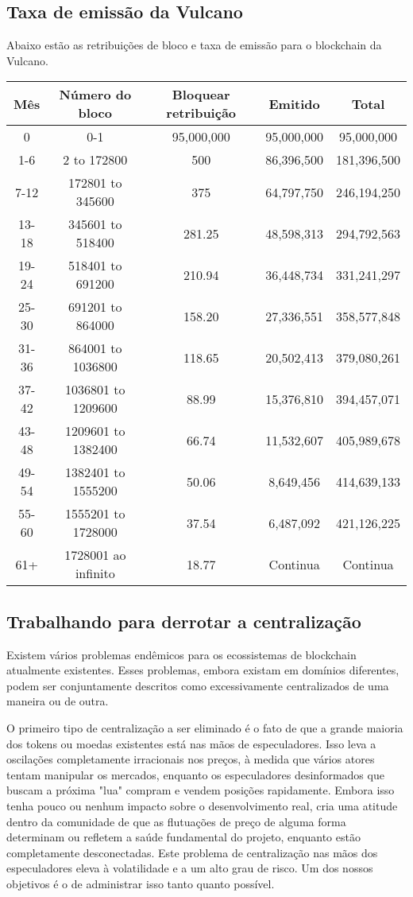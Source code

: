 \documentclass[A4paper, 12pt]{article}
\begin{document}
\subsection{Taxa de emissão da Vulcano}
Abaixo estão as retribuições de bloco e taxa de emissão para o blockchain da Vulcano.
\begin{table}[h]
\centering
\begin{tabular}{@{}ccccc@{}}
\toprule
Mês & Número do bloco & Bloquear retribuição & Emitido & Total \\ \midrule
0 & 0-1 & 95,000,000 & 95,000,000 & 95,000,000 \\
1-6 & 2 to 172800 & 500 & 86,396,500 & 181,396,500 \\
7-12 & 172801 to 345600 & 375 & 64,797,750 & 246,194,250 \\
13-18 & 345601 to 518400 & 281.25 & 48,598,313 & 294,792,563 \\
19-24 & 518401 to 691200 & 210.94 & 36,448,734 & 331,241,297 \\
25-30 & 691201 to 864000 & 158.20 & 27,336,551 & 358,577,848 \\
31-36 & 864001 to 1036800 & 118.65 & 20,502,413 & 379,080,261 \\
37-42 & 1036801 to 1209600 & 88.99 & 15,376,810 & 394,457,071 \\
43-48 & 1209601 to 1382400 & 66.74 & 11,532,607 & 405,989,678 \\
49-54 & 1382401 to 1555200 & 50.06 & 8,649,456 & 414,639,133 \\
55-60 & 1555201 to 1728000 & 37.54 & 6,487,092 & 421,126,225 \\
61+ & 1728001 ao infinito & 18.77 & Continua & Continua \\ \bottomrule
\end{tabular}
\end{table}

\subsection{Trabalhando para derrotar a centralização}
Existem vários problemas endêmicos para os ecossistemas de blockchain atualmente existentes. Esses problemas, embora existam em domínios diferentes, podem ser conjuntamente descritos como excessivamente centralizados de uma maneira ou de outra.

O primeiro tipo de centralização a ser eliminado é o fato de que a grande maioria dos tokens ou moedas existentes está nas mãos de especuladores. Isso leva a oscilações completamente irracionais nos preços, à medida que vários atores tentam manipular os mercados, enquanto os especuladores desinformados que buscam a próxima "lua" compram e vendem posições rapidamente. Embora isso tenha pouco ou nenhum impacto sobre o desenvolvimento real, cria uma atitude dentro da comunidade de que as flutuações de preço de alguma forma determinam ou refletem a saúde fundamental do projeto, enquanto estão completamente desconectadas. Este problema de centralização nas mãos dos especuladores eleva à volatilidade e a um alto grau de risco. Um dos nossos objetivos é o de administrar isso tanto quanto possível.
\end{document}
